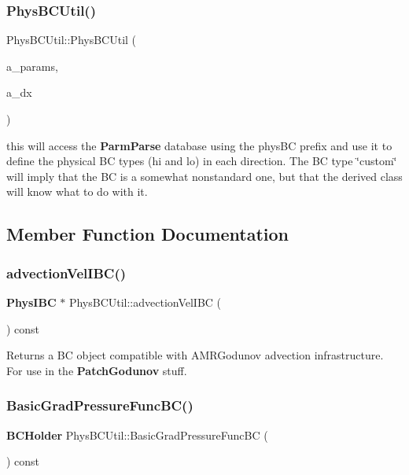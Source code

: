 \subsubsection{\texorpdfstring{Phys\+B\+C\+Util()}{PhysBCUtil()}}
{\footnotesize\ttfamily Phys\+B\+C\+Util\+::\+Phys\+B\+C\+Util (\begin{DoxyParamCaption}\item[{\hyperlink{class_mushy_layer_params}{Mushy\+Layer\+Params}}]{a\+\_\+params,  }\item[{\textbf{ Real}}]{a\+\_\+dx }\end{DoxyParamCaption})}

this will access the \textbf{ Parm\+Parse} database using the phys\+BC prefix and use it to define the physical BC types (hi and lo) in each direction. The BC type \char`\"{}custom\char`\"{} will imply that the BC is a somewhat nonstandard one, but that the derived class will know what to do with it. 

\subsection{Member Function Documentation}
\mbox{\label{class_phys_b_c_util_a9837cec809ca2c0e61a631736fd97de8}} 
\subsubsection{\texorpdfstring{advection\+Vel\+I\+B\+C()}{advectionVelIBC()}}
{\footnotesize\ttfamily \textbf{ Phys\+I\+BC} $\ast$ Phys\+B\+C\+Util\+::advection\+Vel\+I\+BC (\begin{DoxyParamCaption}{ }\end{DoxyParamCaption}) const\hspace{0.3cm}{\ttfamily [virtual]}}

Returns a BC object compatible with A\+M\+R\+Godunov advection infrastructure. For use in the \textbf{ Patch\+Godunov} stuff. \mbox{\label{class_phys_b_c_util_ac29460ba7448a486030ba90ee246cc4f}} 
\subsubsection{\texorpdfstring{Basic\+Grad\+Pressure\+Func\+B\+C()}{BasicGradPressureFuncBC()}}
{\footnotesize\ttfamily \textbf{ B\+C\+Holder} Phys\+B\+C\+Util\+::\+Basic\+Grad\+Pressure\+Func\+BC (\begin{DoxyParamCaption}{ }\end{DoxyParamCaption}) const\hspace{0.3cm}{\ttfamily [virtual]}}



